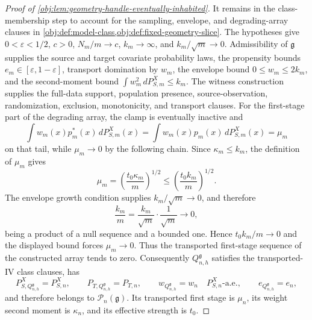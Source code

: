 \begin{proof}[Proof of \cref{obj:lem:geometry-handle-eventually-inhabited}]
It remains in the class-membership step to account for the sampling, envelope, and degrading-array clauses in \cref{obj:def:model-class,obj:def:fixed-geometry-slice}. The hypotheses give \(0<\varepsilon<1/2\), \(c>0\), \(N_m/m\to c\), \(k_m\to\infty\), and \(k_m/\sqrt m\to0\). Admissibility of \(\mathfrak g\) supplies the source and target covariate probability laws, the propensity bounds \(e_m\in[\varepsilon,1-\varepsilon]\), transport domination by \(w_m\), the envelope bound \(0\le w_m\le2k_m\), and the second-moment bound \(\int w_m^2\,dP_{S,m}^X\le k_m\). The witness construction supplies the full-data support, population presence, source-observation, randomization, exclusion, monotonicity, and transport clauses. For the first-stage part of the degrading array, the clamp is eventually inactive and
\[
\int w_m(x)p_m^\ast(x)\,dP_{S,m}^X(x)
=
\int w_m(x)p_m(x)\,dP_{S,m}^X(x)
=
\mu_m
\]
on that tail, while \(\mu_m\to0\) by the following chain. Since \(\kappa_m\le k_m\), the definition of \(\mu_m\) gives
\[
\mu_m=\left(\frac{t_0\kappa_m}{m}\right)^{1/2}\le\left(\frac{t_0k_m}{m}\right)^{1/2}.
\]
The envelope growth condition supplies \(k_m/\sqrt m\to0\), and therefore
\[
\frac{k_m}{m}=\frac{k_m}{\sqrt m}\cdot\frac{1}{\sqrt m}\longrightarrow 0,
\]
being a product of a null sequence and a bounded one. Hence \(t_0k_m/m\to0\) and the displayed bound forces \(\mu_m\to0\). Thus the transported first-stage sequence of the constructed array tends to zero. Consequently \(Q_{n,h}^{\mathfrak g}\) satisfies the transported-IV class clauses, has
\[
P_{S,Q_{n,h}^{\mathfrak g}}^X=P_{S,n}^X,
\qquad
P_{T,Q_{n,h}^{\mathfrak g}}=P_{T,n},
\qquad
w_{Q_{n,h}^{\mathfrak g}}=w_n\quad P_{S,n}^X\text{-a.e.},
\qquad
e_{Q_{n,h}^{\mathfrak g}}=e_n,
\]
and therefore belongs to \(\mathcal P_n(\mathfrak g)\). Its transported first stage is \(\mu_n\), its weight second moment is \(\kappa_n\), and its effective strength is \(t_0\). %


\end{proof}
